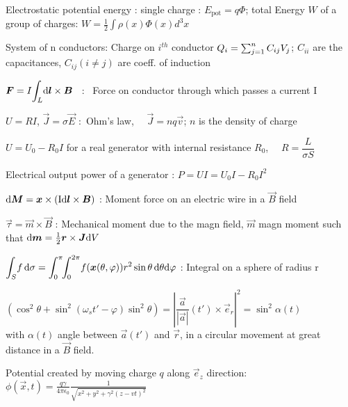 \item Electrostatic potential energy : single charge : $E_{\text{pot}} = q\Phi$; total Energy $W$ of a group of charges: $W=\frac{1}{2}\int\rho(x)\Phi(x)d^3x$

\item System of n conductors: Charge on $i^{th}$ conductor $Q_i=\sum_{\substack j=1}^nC_{ij}V_j$; $C_{ii}$ are the capacitances, $C_{ij} (i\neq j)$ are coeff. of induction 
 
\item $\mbox{\boldmath$F$} = I \displaystyle{\int_L} \mbox{\boldmath$\textrm{d} l$} \times \mbox{\boldmath$B$}$ \, : \, Force on conductor through which passes a current I

\item $U = R I$, $\vec{J} = \sigma\vec{E}$ :\, Ohm's law, $\quad \vec{J} = nq\vec{v}$; $n$ is the density of charge%

\item $U = U_0 - R_0I$ for a real generator with internal resistance $R_0$, $\quad R = \dfrac{L}{\sigma S}$ 

\item Electrical output power of a generator : $P = UI = U_0I - R_0I^2$ %

\item$\mbox{\boldmath$\textrm{d} M$} = \mbox{\boldmath$x$} \times (\rm{I}\mbox{\boldmath$\textrm{d} l$} \times \mbox{\boldmath$B$})$ : Moment force  on an electric wire in a $\vec{B}$ field

\item$\vec{\tau}=\vec{m} \times \vec{B}$ : Mechanical moment due to the magn field, $\vec{m}$ magn moment such that $\mbox{\boldmath$\textrm{d} m$}=\frac{1}{2}\mbox{\boldmath$r$} \times \mbox{\boldmath$J$} \textrm{d} V$

\item$\displaystyle{\int_{S}} f \, \textrm{d} \sigma = \displaystyle{\int_0^{\pi}} \! \displaystyle{\int_0^{2\pi}} f(\mbox{\boldmath$x$}(\theta, \varphi)) r^2\sin\theta \, \textrm{d} \theta\textrm{d} \varphi$ : Integral on a sphere of radius r

\item $\left(\cos^2\theta + \sin^2(\omega_st' - \varphi)\sin^2\theta\right) = \left| \dfrac{\vec{a}}{|\vec{a}|}(t') \times \vec{e}_r \right|^2 =  \sin^2\alpha(t)$ \\
with $\alpha(t)$ angle between $\vec{a}(t')$ and $\vec{r}$, in a circular movement at great distance in a $\vec{B}$ field.%

\item Potential created by moving charge $q$ along $\vec{e}_z$ direction:\\
$\phi(\vec{x},t)=\frac{q\gamma}{4\pi\epsilon_0}\frac{1}{\sqrt{x^2+y^2+\gamma^2(z-vt)^2}}$


